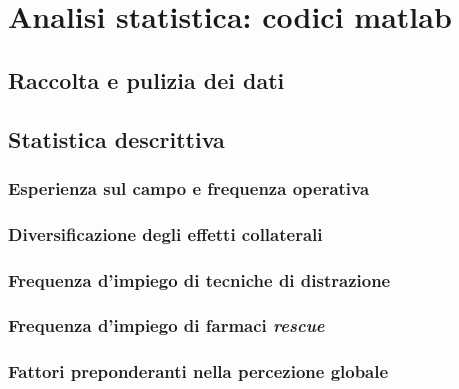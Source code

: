 \chapter{Analisi statistica: codici matlab}

\section{Raccolta e pulizia dei dati}
\label{code:wrangling}

    
    \newpage

\section{Statistica descrittiva}


    \subsection*{Esperienza sul campo e frequenza operativa}
    \label{code:seniority-vs-experience}
    
    \newpage
    
    \subsection*{Diversificazione degli effetti collaterali}
    \label{code:adverse-effects-incidence}
    
    \newpage

    \subsection*{Frequenza d'impiego di tecniche di distrazione}
    \label{code:misdirection-techniques}
    
    \newpage

    \subsection*{Frequenza d'impiego di farmaci \emph{rescue}}
    \label{code:rescue}
    
    \newpage

    \subsection*{Fattori preponderanti nella percezione globale}
    \label{code:satisfaction}
    
    \newpage

